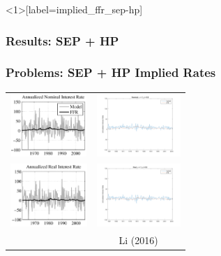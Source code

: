 \documentclass{beamer}
\begin{document}
\begin{frame}<1>[label=implied_ffr_sep-hp]
  \frametitle<1>{Results: SEP + HP}
  \frametitle<2>{Problems: SEP + HP Implied Rates}
\begin{center}
\begin{tabular}{cc}
\includegraphics[height=90px]{figs/implied_ffr/nominal_2_collard.png} &
\includegraphics[height=90px]{figs/implied_ffr/nominal_2.png} \\
\includegraphics[height=90px]{figs/implied_ffr/real_2_collard.png} &
\includegraphics[height=90px]{figs/implied_ffr/real_2.png} \\
\cite{collard11} & Li (2016)
\end{tabular}
\end{center}
\end{frame}
\end{document}
